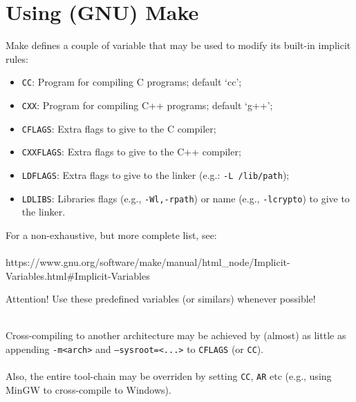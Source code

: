\section{Using (GNU) Make}

\begin{frame}{\secname}
    Make defines a couple of variable that may be used to modify its built-in implicit rules:

    \begin{itemize}
        \item \texttt{CC}: Program for compiling C programs; default ‘cc’;
        \item \texttt{CXX}: Program for compiling C++ programs; default ‘g++’;
        \item \texttt{CFLAGS}: Extra flags to give to the C compiler;
        \item \texttt{CXXFLAGS}: Extra flags to give to the C++ compiler;
        \item \texttt{LDFLAGS}: Extra flags to give to the linker (e.g.: \texttt{-L /lib/path});
        \item \texttt{LDLIBS}: Libraries flags (e.g., \texttt{-Wl,-rpath}) or name (e.g., \texttt{-lcrypto}) to give to the linker.
    \end{itemize}

    For a non-exhaustive, but more complete list, see: \\~\\

    https://www.gnu.org/software/make/manual/html\_node/Implicit-Variables.html\#Implicit-Variables
\end{frame}

\begin{frame}{\secname}
    \begin{alertblock}{Attention!}
        Use these predefined variables (or similars) whenever possible! \\~\\
    \end{alertblock}

    Cross-compiling to another architecture may be achieved
    by (almost) as little as appending \texttt{-m<arch>} and
    \texttt{--sysroot=<...>} to \texttt{CFLAGS} (or \texttt{CC}). \\~\\

    Also, the entire tool-chain may be overriden by setting
    \texttt{CC}, \texttt{AR} etc (e.g., using MinGW to
    cross-compile to Windows).
\end{frame}

